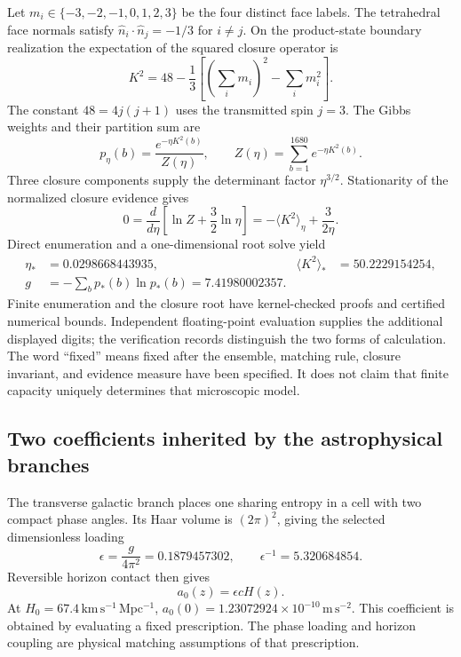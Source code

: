 Let $m_i\in\{-3,-2,-1,0,1,2,3\}$ be the four distinct face labels.
The tetrahedral face normals satisfy
$\widehat n_i\cdot\widehat n_j=-1/3$ for $i\ne j$. On the product-state
boundary realization the expectation of the squared closure operator is
\begin{equation}
K^2=48-\frac13\left[\left(\sum_i m_i\right)^2-\sum_i m_i^2\right].
\label{eq:K}
\end{equation}
The constant $48=4j(j+1)$ uses the transmitted spin $j=3$.
The Gibbs weights and their partition sum are
\begin{equation}
p_\eta(b)=\frac{e^{-\eta K^2(b)}}{Z(\eta)},\qquad
Z(\eta)=\sum_{b=1}^{1680}e^{-\eta K^2(b)}.
\end{equation}
Three closure components supply the determinant factor $\eta^{3/2}$.
Stationarity of the normalized closure evidence gives
\begin{equation}
0=\frac{d}{d\eta}\left[\ln Z+\frac32\ln\eta\right]
=-\langle K^2\rangle_\eta+\frac{3}{2\eta}.
\end{equation}
Direct enumeration and a one-dimensional root solve yield
\begin{align}
\eta_*&=0.0298668443935, & \langle K^2\rangle_*&=50.2229154254,\\
g&=-\sum_b p_*(b)\ln p_*(b)=7.41980002357.
\label{eq:g}
\end{align}
Finite enumeration and the closure root have kernel-checked proofs and
certified numerical bounds. Independent floating-point evaluation supplies
the additional displayed digits; the verification records distinguish the
two forms of calculation. 
The word ``fixed'' means fixed after the ensemble, matching rule,
closure invariant, and evidence measure have been specified. It does not
claim that finite capacity uniquely determines that microscopic model.

\subsection{Two coefficients inherited by the astrophysical branches}

The transverse galactic branch places one sharing entropy in a cell with
two compact phase angles. Its Haar volume is $(2\pi)^2$, giving the
selected dimensionless loading
\begin{equation}
\epsilon=\frac{g}{4\pi^2}=0.1879457302,
\qquad \epsilon^{-1}=5.320684854.
\label{eq:eps}
\end{equation}
Reversible horizon contact then gives
\begin{equation}
a_0(z)=\epsilon cH(z).
\label{eq:a0}
\end{equation}
At $H_0=67.4\,\mathrm{km\,s^{-1}\,Mpc^{-1}}$,
$a_0(0)=1.23072924\times10^{-10}\,\mathrm{m\,s^{-2}}$.
This coefficient is obtained by evaluating a fixed prescription.
The phase loading and horizon coupling are physical matching assumptions
of that prescription. 

